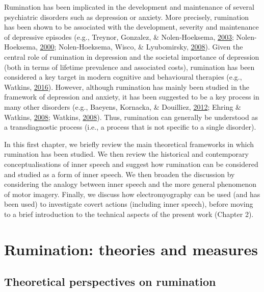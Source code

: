 \documentclass[a4paper,12pt,twoside,openright,oldfontcommands]{memoir}
\begin{document}
Rumination has been implicated in the development and maintenance of several psychiatric disorders such as depression or anxiety. More precisely, rumination has been shown to be associated with the development, severity and maintenance of depressive episodes (e.g., Treynor, Gonzalez, \& Nolen-Hoeksema, \protect\hyperlink{ref-treynor_rumination_2003}{2003}; Nolen-Hoeksema, \protect\hyperlink{ref-Nolen-Hoeksema2000}{2000}; Nolen-Hoeksema, Wisco, \& Lyubomirsky, \protect\hyperlink{ref-Nolen-Hoeksema2008}{2008}). Given the central role of rumination in depression and the societal importance of depression (both in terms of lifetime prevalence and associated costs), rumination has been considered a key target in modern cognitive and behavioural therapies (e.g., Watkins, \protect\hyperlink{ref-watkins_rumination-focused_2016}{2016}). However, although rumination has mainly been studied in the framework of depression and anxiety, it has been suggested to be a key process in many other disorders (e.g., Baeyens, Kornacka, \& Douilliez, \protect\hyperlink{ref-Baeyens2012}{2012}; Ehring \& Watkins, \protect\hyperlink{ref-ehring_repetitive_2008}{2008}; Watkins, \protect\hyperlink{ref-Watkins2008}{2008}). Thus, rumination can generally be understood as a transdiagnostic process (i.e., a process that is not specific to a single disorder).

In this first chapter, we briefly review the main theoretical frameworks in which rumination has been studied. We then review the historical and contemporary conceptualisations of inner speech and suggest how rumination can be considered and studied as a form of inner speech. We then broaden the discussion by considering the analogy between inner speech and the more general phenomenon of motor imagery. Finally, we discuss how electromyography can be used (and has been used) to investigate covert actions (including inner speech), before moving to a brief introduction to the technical aspects of the present work (Chapter 2).

\hypertarget{rumination-theories-and-measures}{%
\section{Rumination: theories and measures}\label{rumination-theories-and-measures}}

\hypertarget{theoretical-perspectives-on-rumination}{%
\subsection{Theoretical perspectives on rumination}\label{theoretical-perspectives-on-rumination}}
\end{document}
